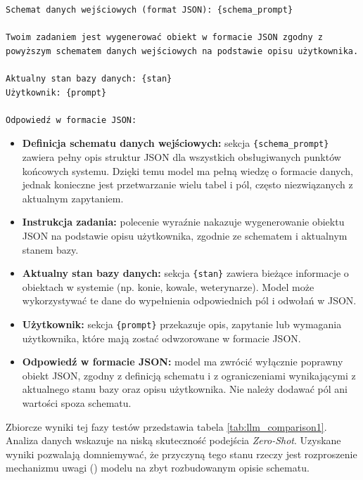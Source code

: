 \newpage
\begin{wykaz}[ht]
    \centering
    \begin{tcolorbox}[colback=gray!5, colframe=gray!50, arc=0mm, boxrule=0.5pt]
        \begin{verbatim}
Schemat danych wejściowych (format JSON): {schema_prompt}

Twoim zadaniem jest wygenerować obiekt w formacie JSON zgodny z powyższym schematem danych wejściowych na podstawie opisu użytkownika. 

Aktualny stan bazy danych: {stan}
Użytkownik: {prompt}

Odpowiedź w formacie JSON:
        \end{verbatim}
    \end{tcolorbox}
    \caption{Struktura pierwotnego zapytania zawierająca pełny schemat bazy danych.}
    \label{wyk:prompt_verbatim}
\end{wykaz}

\begin{itemize}
    \item \textbf{Definicja schematu danych wejściowych:} sekcja \texttt{\{schema\_prompt\}} zawiera pełny opis struktur JSON dla wszystkich obsługiwanych punktów końcowych systemu. Dzięki temu model ma pełną wiedzę o formacie danych, jednak konieczne jest przetwarzanie wielu tabel i pól, często niezwiązanych z aktualnym zapytaniem.
    \item \textbf{Instrukcja zadania:} polecenie wyraźnie nakazuje wygenerowanie obiektu JSON na podstawie opisu użytkownika, zgodnie ze schematem i aktualnym stanem bazy.
    \item \textbf{Aktualny stan bazy danych:} sekcja \texttt{\{stan\}} zawiera bieżące informacje o obiektach w systemie (np. konie, kowale, weterynarze). Model może wykorzystywać te dane do wypełnienia odpowiednich pól i odwołań w JSON.
    \item \textbf{Użytkownik:} sekcja \texttt{\{prompt\}} przekazuje opis, zapytanie lub wymagania użytkownika, które mają zostać odwzorowane w formacie JSON.
    \item \textbf{Odpowiedź w formacie JSON:} model ma zwrócić wyłącznie poprawny obiekt JSON, zgodny z definicją schematu i z ograniczeniami wynikającymi z aktualnego stanu bazy oraz opisu użytkownika. Nie należy dodawać pól ani wartości spoza schematu.
\end{itemize}

Zbiorcze wyniki tej fazy testów przedstawia tabela \ref{tab:llm_comparison1}. Analiza danych wskazuje na niską skuteczność podejścia \textit{Zero-Shot}. Uzyskane wyniki pozwalają domniemywać, że przyczyną tego stanu rzeczy jest rozproszenie mechanizmu uwagi () modelu na zbyt rozbudowanym opisie schematu.

